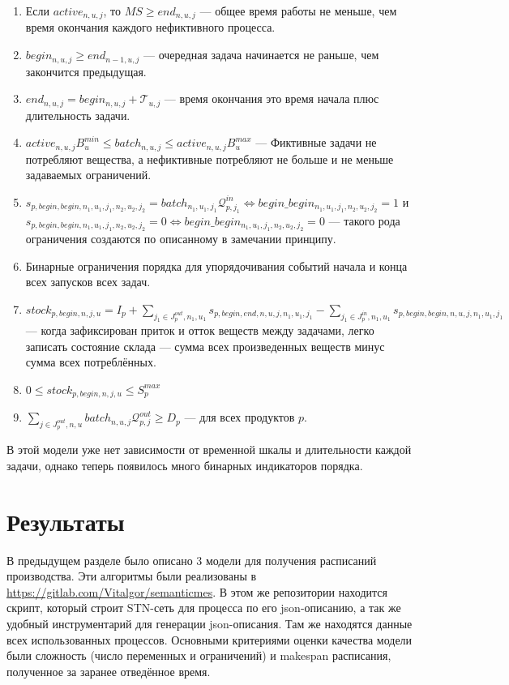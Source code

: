 \documentclass[12pt, twoside]{article}
\theoremstyle{definition}
\newcommand{\Tau}{\mathcal{T}}
\begin{document}
\begin{enumerate}
	\item Если $active_{n, u, j}$, то $MS \geq end_{n, u, j}$ --- общее время работы не меньше, чем время окончания каждого нефиктивного процесса.
	\item $begin_{n, u, j} \geq end_{n-1, u, j}$ --- очередная задача начинается не раньше, чем закончится предыдущая.
	\item $end_{n, u, j} = begin_{n, u, j} + \Tau_{u, j}$ --- время окончания это время начала плюс длительность задачи.
	\item $active_{n, u, j}B^{min}_u \leq batch_{n, u, j} \leq active_{n, u, j}B^{max}_u$ --- Фиктивные задачи не потребляют вещества, а нефиктивные потребляют не больше и не меньше задаваемых ограничений.
	\item $s_{p, begin, begin, n_1, u_1, j_1, n_2, u_2, j_2} = batch_{n_1, u_1, j_1}\mathcal{Q}^{in}_{p, j_1} \Leftrightarrow begin\_begin_{n_1, u_1, j_1, n_2, u_2, j_2} = 1$ и $s_{p, begin, begin, n_1, u_1, j_1, n_2, u_2, j_2} = 0 \Leftrightarrow begin\_begin_{n_1, u_1, j_1, n_2, u_2, j_2} = 0$ --- такого рода ограничения создаются по описанному в замечании принципу.
	\item Бинарные ограничения порядка для упорядочивания событий начала и конца всех запусков всех задач.
	\item $stock_{p, begin, n, j, u} = I_p + \displaystyle\sum_{j_1 \in J^{out}_p, n_1, u_1} s_{p, begin, end, n, u, j, n_1, u_1, j_1} - \displaystyle\sum_{j_1 \in J^{in}_p, n_1, u_1} s_{p, begin, begin, n, u, j, n_1, u_1, j_1}$ --- когда зафиксирован приток и отток веществ между задачами, легко записать состояние склада --- сумма всех произведенных веществ минус сумма всех потреблённых.
	\item $0 \leq stock_{p, begin, n, j, u} \leq S^{max}_p$
	\item $\displaystyle\sum_{j \in J^{out}_p, n, u} batch_{n, u, j} \mathcal{Q}^{out}_{p, j} \geq D_p$ --- для всех продуктов $p$.
\end{enumerate}

В этой модели уже нет зависимости от временной шкалы и длительности каждой задачи, однако теперь появилось много бинарных индикаторов порядка.

\section{Результаты}

В предыдущем разделе было описано 3 модели для получения расписаний производства. Эти алгоритмы были реализованы в \url{https://gitlab.com/Vitalgor/semanticmes}. В этом же репозитории находится скрипт, который строит STN-сеть для процесса по его json-описанию, а так же удобный инструментарий для генерации json-описания. Там же находятся данные всех использованных процессов. Основными критериями оценки качества модели были сложность (число переменных и ограничений) и makespan расписания, полученное за заранее отведённое время.
\end{document}
